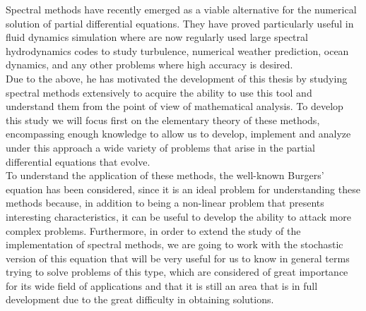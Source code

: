 	Spectral methods have recently emerged as a viable alternative for the numerical solution of partial differential equations. They have proved particularly useful in fluid dynamics simulation where are now regularly used large spectral hydrodynamics codes to study turbulence, numerical weather prediction, ocean dynamics, and any other problems where high accuracy is desired. \\
	
	Due to the above, he has motivated the development of this thesis by studying spectral methods extensively to acquire the ability to use this tool and understand them from the point of view of mathematical analysis. To develop this study we will focus first on the elementary theory of these methods, encompassing enough knowledge to allow us to develop, implement and analyze under this approach a wide variety of problems that arise in the partial differential equations that evolve. \\
	
	To understand the application of these methods, the well-known Burgers' equation has been considered, since it is an ideal problem for understanding these methods because, in addition to being a non-linear problem that presents interesting characteristics, it can be useful to develop the ability to attack more complex problems. Furthermore, in order to extend the study of the implementation of spectral methods, we are going to work with the stochastic version of this equation that will be very useful for us to know in general terms trying to solve problems of this type, which are considered of great importance for its wide field of applications and that it is still an area that is in full development due to the great difficulty in obtaining solutions. \\
	
